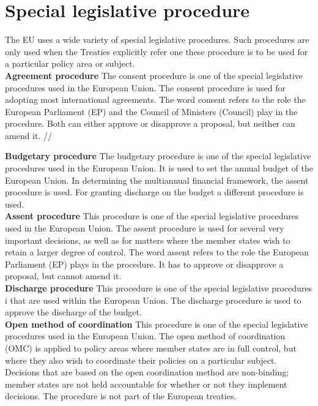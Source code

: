 \section{Special legislative procedure}
\label{sec:SLP}

The EU uses a wide variety of special legislative procedures. Such procedures are only used when the Treaties explicitly refer one these procedure is to be used for a particular policy area or subject. \\

\textbf{Agreement procedure}
The consent procedure is one of the special legislative procedures used in the European Union. The consent procedure is used for adopting most international agreements. The word consent refers to the role the European Parliament (EP) and the Council of Ministers (Council) play in the procedure. Both can either approve or disapprove a proposal, but neither can amend it. //

\textbf{Budgetary procedure}
The budgetary procedure is one of the special legislative procedures used in the European Union. It is used to set the annual budget of the European Union. In determining the multiannual financial framework, the assent procedure is used. For granting discharge on the budget a different procedure is used. \\

\textbf{Assent procedure}
This procedure is one of the special legislative procedures used in the European Union. The assent procedure is used for several very important decisions, as well as for matters where the member states wish to retain a larger degree of control. The word assent refers to the role the European Parliament (EP) plays in the procedure. It has to approve or disapprove a proposal, but cannot amend it. \\

\textbf{Discharge procedure}
This procedure is one of the special legislative procedures i that are used within the European Union. The discharge procedure is used to approve the discharge of the budget. \\

\textbf{Open method of coordination}
This procedure is one of the special legislative procedures used in the European Union. The open method of coordination (OMC) is applied to policy areas where member states are in full control, but where they also wish to coordinate their policies on a particular subject. Decisions that are based on the open coordination method are non-binding; member states are not held accountable for whether or not they implement decisions. The procedure is not part of the European treaties.


